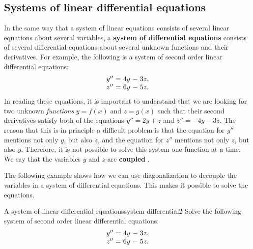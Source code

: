 \subsection{Systems of linear differential equations}

In the same way that a system of linear equations consists of several
linear equations about several variables, a \textbf{system of
  differential equations}%
%
 consists of several
differential equations about several unknown functions and their
derivatives. For example, the following is a system of second order
linear differential equations:
\begin{equation*}
  \begin{array}{c@{~}c@{~}r@{~}r@{~}r}
    y'' &=& 4y &-& 3z, \\
    z'' &=& 6y &-& 5z. \\
  \end{array}
\end{equation*}
In reading these equations, it is important to understand that we are
looking for two unknown {\em functions} $y=f(x)$ and $z=g(x)$ such
that their second derivatives satisfy both of the equations
$y''=2y+z$ and $z''=-4y-3z$. The reason that this is in principle a
difficult problem is that the equation for $y''$ mentions not only
$y$, but also $z$, and the equation for $z''$ mentions not only $z$,
but also $y$. Therefore, it is not possible to solve this system one
function at a time. We say that the variables $y$ and $z$ are
\textbf{coupled}%
%
.

The following example shows how we can use diagonalization to decouple
the variables in a system of differential equations. This makes it
possible to solve the equations.

\begin{example}{A system of linear differential equations}{system-differential2}
  Solve the following system of second order linear differential equations:
  \begin{equation*}
    \begin{array}{c@{~}c@{~}r@{~}r@{~}r}
      y'' &=& 4y &-& 3z, \\
      z'' &=& 6y &-& 5z. \\
    \end{array}
  \end{equation*}
\end{example}


